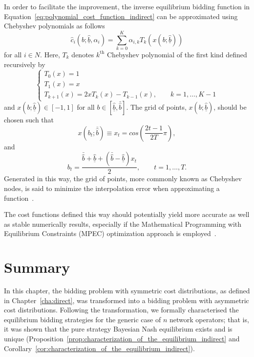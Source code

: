 In order to facilitate the improvement, the inverse equilibrium bidding function in Equation~\eqref{eq:polynomial_cost_function_indirect} can be approximated using Chebyshev polynomials as follows
\begin{equation*}
  \displaystyle\hat{c}_i(b;\underline{\hat{b}},\alpha_i) = \sum_{k=0}^K \alpha_{i,k} T_k\left(x(b;\underline{\hat{b}})\right)
\end{equation*}
for all $i\in N$. Here, $T_k$ denotes $k^{\textrm{th}}$ Chebyshev polynomial of the first kind defined recursively by
\begin{equation*}
  \left\{
    \begin{array}{l}
      T_0(x) = 1\\
      T_1(x) = x\\
      T_{k+1}(x) = 2xT_k(x) - T_{k-1}(x), \qquad k=1,\ldots,K-1
    \end{array}
  \right.
\end{equation*}
and $x(b;\underline{\hat{b}})\in [-1,1]$ for all $b\in [\underline{\hat{b}}, \bar{\hat{b}}]$. The grid of points, $x(b;\underline{\hat{b}})$, should be chosen such that
\begin{equation*}
  \displaystyle x(b_t;\bar{\hat{b}}) \equiv x_t = cos\left(\frac{2t-1}{2T}\pi\right),
\end{equation*}
and
\begin{equation*}
  b_t = \frac{\bar{\hat{b}} + \underline{\hat{b}} + (\bar{\hat{b}} - \underline{\hat{b}})x_t}{2}, \qquad t = 1,\ldots,T.
\end{equation*}
Generated in this way, the grid of points, more commonly known as Chebyshev nodes, is said to minimize the interpolation error when approximating a function~\cite{Hubbard2011}.

The cost functions defined this way should potentially yield more accurate as well as stable numerically results, especially if the Mathematical Programming with Equilibrium Constraints (MPEC) optimization approach is employed~\cite{HubbardPaarsch2011,Hubbard2011}.


\section{Summary}
\label{sec:summary_indirect}
In this chapter, the bidding problem with symmetric cost distributions, as defined in Chapter~\ref{cha:direct}, was transformed into a bidding problem with asymmetric cost distributions. Following the transformation, we formally characterised the equilibrium bidding strategies for the generic case of $n$ network operators; that is, it was shown that the pure strategy Bayesian Nash equilibrium exists and is unique (Proposition~\ref{prop:characterization_of_the_equilibrium_indirect} and Corollary~\ref{cor:characterization_of_the_equilibrium_indirect}).

